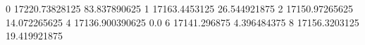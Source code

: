 0 17220.73828125 83.837890625
1 17163.4453125 26.544921875
2 17150.97265625 14.072265625
4 17136.900390625 0.0
6 17141.296875 4.396484375
8 17156.3203125 19.419921875
